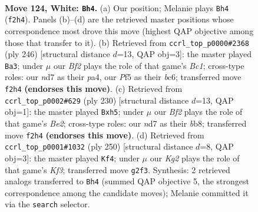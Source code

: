 \documentclass[11pt]{article}
\begin{document}
\clearpage

\begin{figure}[p]\centering
\begin{subfigure}{0.46\textwidth}\centering
\resizebox{\linewidth}{!}{%
\newchessgame
\chessboard[
  setfen={6k1/3n4/8/5P1P/p7/P7/5BK1/8 w - - 3 124},
  showmover=false,
  pgfstyle=straightmove, color=movearrow, markmove={f2-h4}
]}
\caption{}
\end{subfigure}\hfill
\begin{subfigure}{0.46\textwidth}\centering
\resizebox{\linewidth}{!}{%
\newchessgame
\chessboard[
  setfen={8/8/2b1k3/7p/p6P/8/8/1KB5 w - - 6 124},
  showmover=false,
  pgfstyle=straightmove, color=movearrow, markmove={c1-a3}
]}
\caption{}
\end{subfigure}
\\[4pt]
\begin{subfigure}{0.46\textwidth}\centering
\resizebox{\linewidth}{!}{%
\newchessgame
\chessboard[
  setfen={1b6/1P6/8/5k1p/7P/8/4B3/5K2 w - - 19 116},
  showmover=false,
  pgfstyle=straightmove, color=movearrow, markmove={e2-h5}
]}
\caption{}
\end{subfigure}\hfill
\begin{subfigure}{0.46\textwidth}\centering
\resizebox{\linewidth}{!}{%
\newchessgame
\chessboard[
  setfen={8/6k1/5p2/1n3P2/7P/4BK2/8/8 w - - 55 126},
  showmover=false,
  pgfstyle=straightmove, color=movearrow, markmove={f3-f4}
]}
\caption{}
\end{subfigure}
\caption{\textbf{Move 124, White: \texttt{Bh4}.} (a) Our position; Melanie plays \texttt{Bh4} (\texttt{f2h4}). Panels (b)--(d) are the retrieved master positions whose correspondence most drove this move (highest QAP objective among those that transfer to it). (b) Retrieved from \texttt{ccrl\_top\_p0000\#2368} (ply 246) [structural distance $d$=13, QAP obj=3]: the master played \texttt{Ba3}; under $\mu$ our \emph{Bf2} plays the role of that game's \emph{Bc1}; cross-type roles: our \emph{n}d7 as their \emph{p}a4, our \emph{P}f5 as their \emph{b}c6; transferred move \texttt{f2h4} \textbf{(endorses this move)}. (c) Retrieved from \texttt{ccrl\_top\_p0002\#629} (ply 230) [structural distance $d$=13, QAP obj=1]: the master played \texttt{Bxh5}; under $\mu$ our \emph{Bf2} plays the role of that game's \emph{Be2}; cross-type roles: our \emph{n}d7 as their \emph{b}b8; transferred move \texttt{f2h4} \textbf{(endorses this move)}. (d) Retrieved from \texttt{ccrl\_top\_p0001\#1032} (ply 250) [structural distance $d$=8, QAP obj=3]: the master played \texttt{Kf4}; under $\mu$ our \emph{Kg2} plays the role of that game's \emph{Kf3}; transferred move \texttt{g2f3}. Synthesis: 2 retrieved analogs transferred to \texttt{Bh4} (summed QAP objective 5, the strongest correspondence among the candidate moves); Melanie committed it via the \texttt{search} selector.}
\label{fig:thought-m246}
\end{figure}
\end{document}

